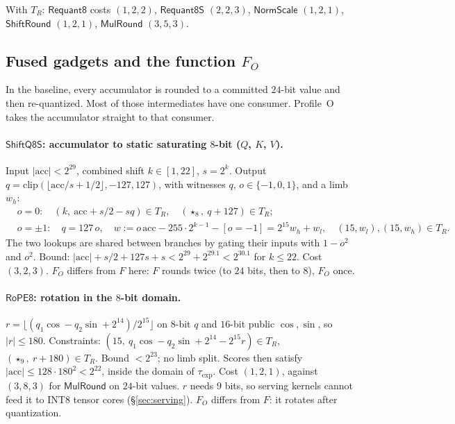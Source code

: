 \documentclass[11pt]{article}
\begin{document}
With \(T_R\): \(\mathsf{Requant8}\) costs \((1,2,2)\), \(\mathsf{Requant8S}\) \((2,2,3)\), \(\mathsf{NormScale}\) \((1,2,1)\), \(\mathsf{ShiftRound}\) \((1,2,1)\), \(\mathsf{MulRound}\) \((3,5,3)\).

\subsection{Fused gadgets and the function \texorpdfstring{\(F_O\)}{F\_O}}
\label{sec:opt-fused}

In the baseline, every accumulator is rounded to a committed \(24\)-bit value and then re-quantized.
Most of those intermediates have one consumer.
Profile~O takes the accumulator straight to that consumer.

\paragraph{\(\mathsf{ShiftQ8S}\): accumulator to static saturating \(8\)-bit (\(Q\), \(K\), \(V\)).}
Input \(|\mathrm{acc}| < 2^{29}\), combined shift \(k \in [1, 22]\), \(s = 2^k\).
Output \(q = \mathrm{clip}(\lfloor \mathrm{acc}/s + 1/2 \rfloor, -127, 127)\), with witnesses \(q\), \(o \in \{-1,0,1\}\), and a limb \(w_h\):
\begin{align*}
& o = 0:\quad (k,\ \mathrm{acc} + s/2 - s q) \in T_R,\quad (\star_8,\ q + 127) \in T_R;\\
& o = \pm 1:\quad q = 127\,o,\quad w := o\,\mathrm{acc} - 255\cdot 2^{k-1} - [o = -1] = 2^{15} w_h + w_l,\quad (15, w_l), (15, w_h) \in T_R.
\end{align*}
The two lookups are shared between branches by gating their inputs with \(1-o^2\) and \(o^2\).
Bound: \(|\mathrm{acc}| + s/2 + 127 s + s < 2^{29} + 2^{29.1} < 2^{30.1}\) for \(k \le 22\).
Cost \((3, 2, 3)\).
\(F_O\) differs from \(F\) here: \(F\) rounds twice (to \(24\) bits, then to \(8\)), \(F_O\) once.

\paragraph{\(\mathsf{RoPE8}\): rotation in the \(8\)-bit domain.}
\(r = \lfloor (q_1 \cos - q_2 \sin + 2^{14}) / 2^{15} \rfloor\) on \(8\)-bit \(q\) and \(16\)-bit public \(\cos, \sin\), so \(|r| \le 180\).
Constraints: \((15,\ q_1 \cos - q_2\sin + 2^{14} - 2^{15} r) \in T_R\), \((\star_9,\ r + 180) \in T_R\).
Bound \(< 2^{23}\); no limb split.
Scores then satisfy \(|\mathrm{acc}| \le 128 \cdot 180^2 < 2^{22}\), inside the domain of \(\tau_{\exp}\).
Cost \((1,2,1)\), against \((3,8,3)\) for \(\mathsf{MulRound}\) on \(24\)-bit values.
\(r\) needs \(9\) bits, so serving kernels cannot feed it to INT8 tensor cores (\S\ref{sec:serving}).
\(F_O\) differs from \(F\): it rotates after quantization.
\end{document}
